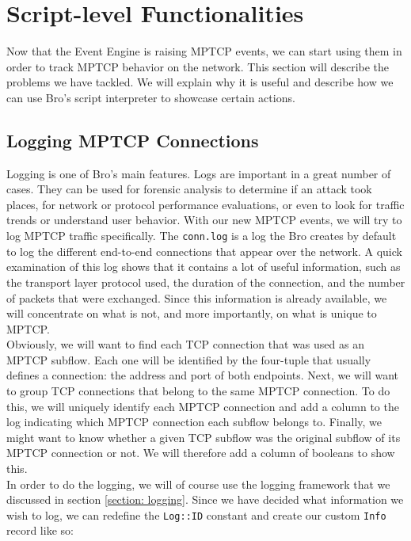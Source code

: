 
\chapter{Script-level Functionalities} \label{chap:script}
Now that the Event Engine is raising MPTCP events, we can start using them in order to track MPTCP behavior on the network. This section will describe the problems we have tackled. We will explain why it is useful and describe how we can use Bro's script interpreter to showcase certain actions.

\section{Logging MPTCP Connections}
Logging is one of Bro's main features. Logs are important in a great number of cases. They can be used for forensic analysis to determine if an attack took places, for network or protocol performance evaluations, or even to look for traffic trends or understand user behavior. With our new MPTCP events, we will try to log MPTCP traffic specifically. The \texttt{conn.log} is a log the Bro creates by default to log the different end-to-end connections that appear over the network. A quick examination of this log shows that it contains a lot of useful information, such as the transport layer protocol used, the duration of the connection, and the number of packets that were exchanged. Since this information is already available, we will concentrate on what is not, and more importantly, on what is unique to MPTCP. \\

Obviously, we will want to find each TCP connection that was used as an MPTCP subflow. Each one will be identified by the four-tuple that usually defines a connection: the address and port of both endpoints. Next, we will want to group TCP connections that belong to the same MPTCP connection. To do this, we will uniquely identify each MPTCP connection and add a column to the log indicating which MPTCP connection each subflow belongs to. Finally, we might want to know whether a given TCP subflow was the original subflow of its MPTCP connection or not. We will therefore add a column of booleans to show this. \\

In order to do the logging, we will of course use the logging framework that we discussed in section \ref{section: logging}. Since we have decided what information we wish to log, we can redefine the \texttt{Log::ID} constant and create our custom \texttt{Info} record like so: \\

